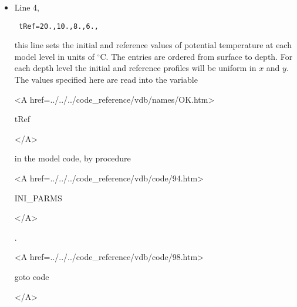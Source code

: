 \begin{itemize}

\item Line 4, 
\begin{verbatim} tRef=20.,10.,8.,6., \end{verbatim} 
this line sets
the initial and reference values of potential temperature at each model
level in units of $^{\circ}$C.
The entries are ordered from surface to depth. For each
depth level the initial and reference profiles will be uniform in
$x$ and $y$. The values specified here are read into the
variable 
{\bf
\begin{rawhtml} <A href=../../../code_reference/vdb/names/OK.htm> \end{rawhtml}
tRef
\begin{rawhtml} </A>\end{rawhtml}
} 
in the model code, by procedure 
{\it
\begin{rawhtml} <A href=../../../code_reference/vdb/code/94.htm> \end{rawhtml}
INI\_PARMS
\begin{rawhtml} </A>\end{rawhtml}
}.

\newcommand{\VARtref}{
{\bf
\begin{rawhtml} <A href=../../../code_reference/vdb/names/OK.htm> \end{rawhtml}
tRef
\begin{rawhtml} </A>\end{rawhtml}
} 
}



{\bf
\begin{rawhtml} <A href=../../../code_reference/vdb/code/98.htm> \end{rawhtml}
goto code
\begin{rawhtml} </A>\end{rawhtml}
}



\end{itemize}
